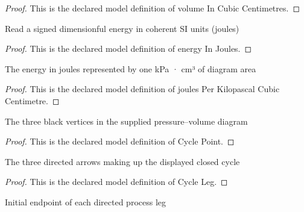 \begin{proof}
  This is the declared model definition of volume In Cubic Centimetres.
\end{proof}
\begin{definition}
  \label{def:physics:phyx-mini-0420:phyxminiproblems-problemphyxmini0420-energyinjoules}
  Read a signed dimensionful energy in coherent SI units (joules)
\end{definition}
\begin{proof}
  This is the declared model definition of energy In Joules.
\end{proof}
\begin{definition}
  \label{def:physics:phyx-mini-0420:phyxminiproblems-problemphyxmini0420-joulesperkilopascalcubiccentimetre}
  The energy in joules represented by one kPa · cm³ of diagram area
\end{definition}
\begin{proof}
  This is the declared model definition of joules Per Kilopascal Cubic Centimetre.
\end{proof}
\begin{definition}
  \label{def:physics:phyx-mini-0420:phyxminiproblems-problemphyxmini0420-cyclepoint}
  The three black vertices in the supplied pressure--volume diagram
\end{definition}
\begin{proof}
  This is the declared model definition of Cycle Point.
\end{proof}
\begin{definition}
  \label{def:physics:phyx-mini-0420:phyxminiproblems-problemphyxmini0420-cycleleg}
  The three directed arrows making up the displayed closed cycle
\end{definition}
\begin{proof}
  This is the declared model definition of Cycle Leg.
\end{proof}
\begin{definition}
  \label{def:physics:phyx-mini-0420:phyxminiproblems-problemphyxmini0420-legstart}
  Initial endpoint of each directed process leg
\end{definition}
